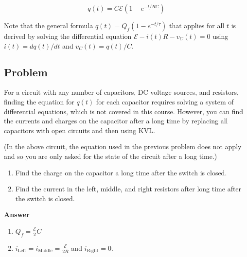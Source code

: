 \documentclass{article}
\newcommand{\ds}[0]{\displaystyle}
\begin{document}
\begin{equation}
q(t)=C\mathcal{E}(1-e^{-t/RC})
\end{equation}

Note that the general formula $q(t)=Q_f(1-e^{-t/\tau})$ that applies for all $t$ is derived by solving the differential equation $\mathcal{E}-i(t)R-v_C(t)=0$ using $i(t)=dq(t)/dt$ and $v_C(t)=q(t)/C$.

\ifsolutions

\else

\newpage
\fi
\ifsolutions\else
\newpage
\fi

\subsection{Problem}

For a circuit with any number of capacitors, DC voltage sources, and resistors, finding the equation for $q(t)$ for each capacitor requires solving a system of differential equations, which is not covered in this course. However, you can find the currents and charges on the capacitor after a long time by replacing all capacitors with open circuits and then using KVL.



(In the above circuit, the equation used in the previous problem does not apply and so you are only asked for the state of the circuit after a long time.)

\begin{enumerate}

  \item Find the charge on the capacitor a long time after the switch is closed.

  \item Find the current in the left, middle, and right resistors after long time after the switch is closed.

\end{enumerate}

\ifsolutions
\textbf{Answer}

    \begin{enumerate}

      \item $\ds Q_f=\frac{\mathcal{E}}{2}C$

      \item $\ds i_{\text{Left}}=i_{\text{Middle}}=\frac{\mathcal{E}}{2R}$ and $i_{\text{Right}}=0$.

    \end{enumerate}
\end{document}
